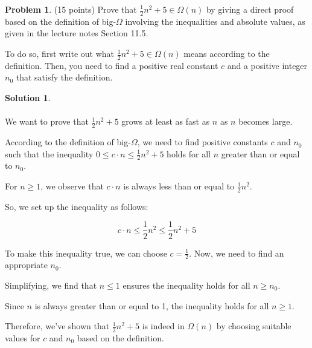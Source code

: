 \documentclass{article}
\theoremstyle{definition}
\newtheorem{problem}{Problem}
\newtheorem*{solution}{Solution}
\begin{document}
\newpage
\begin{problem} (15 points) 
Prove that $\frac{1}{2}n^2+5 \in \Omega(n)$ by giving a direct proof based on the 
definition of big-$\Omega$ involving the inequalities and absolute values, as given 
in the lecture notes Section 11.5.

To do so, first write out what $\frac{1}{2}n^2+5 \in \Omega(n)$ means according 
to the definition. Then, you need to find a positive real constant $c$ and a positive 
integer $n_0$ that satisfy the definition.
\end{problem}
\begin{solution}

~\\
~\\  
We want to prove that $\frac{1}{2}n^2 + 5$ grows at least as fast as $n$ as $n$ becomes large.

According to the definition of big-$\Omega$, we need to find positive constants $c$ and $n_0$ such that the inequality $0 \leq c \cdot n \leq \frac{1}{2}n^2 + 5$ holds for all $n$ greater than or equal to $n_0$.

For $n \geq 1$, we observe that $c \cdot n$ is always less than or equal to $\frac{1}{2}n^2$.

So, we set up the inequality as follows:

\[
c \cdot n \leq \frac{1}{2}n^2 \leq \frac{1}{2}n^2 + 5
\]

To make this inequality true, we can choose $c = \frac{1}{2}$. Now, we need to find an appropriate $n_0$.

Simplifying, we find that $n \leq 1$ ensures the inequality holds for all $n \geq n_0$.

Since $n$ is always greater than or equal to 1, the inequality holds for all $n \geq 1$.

Therefore, we've shown that $\frac{1}{2}n^2 + 5$ is indeed in $\Omega(n)$ by choosing suitable values for $c$ and $n_0$ based on the definition.
\end{solution}
\end{document}
